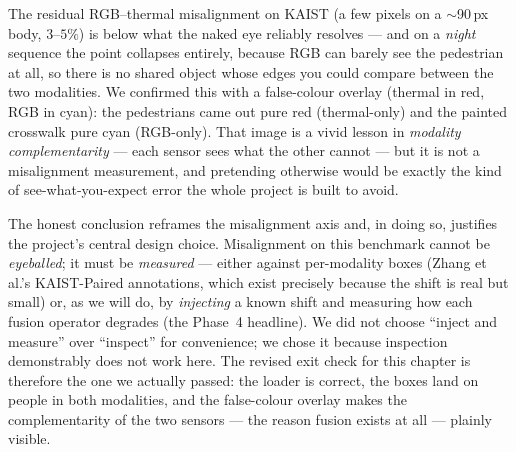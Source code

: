 \documentclass[../main.tex]{subfiles}
\begin{document}
\begin{lesson}
The residual RGB--thermal misalignment on KAIST (a few pixels on a $\sim$90\,px body,
$3$--$5\%$) is below what the naked eye reliably resolves --- and on a \emph{night} sequence
the point collapses entirely, because RGB can barely see the pedestrian at all, so there is no
shared object whose edges you could compare between the two modalities. We confirmed this with
a false-colour overlay (thermal in red, RGB in cyan): the pedestrians came out pure red
(thermal-only) and the painted crosswalk pure cyan (RGB-only). That image is a vivid lesson in
\emph{modality complementarity} --- each sensor sees what the other cannot --- but it is not a
misalignment measurement, and pretending otherwise would be exactly the kind of
see-what-you-expect error the whole project is built to avoid.
\end{lesson}

The honest conclusion reframes the misalignment axis and, in doing so, justifies the project's
central design choice. Misalignment on this benchmark cannot be \emph{eyeballed}; it must be
\emph{measured} --- either against per-modality boxes (Zhang et al.'s KAIST-Paired annotations,
which exist precisely because the shift is real but small) or, as we will do, by \emph{injecting}
a known shift and measuring how each fusion operator degrades (the Phase~4 headline). We did not
choose ``inject and measure'' over ``inspect'' for convenience; we chose it because inspection
demonstrably does not work here. The revised exit check for this chapter is therefore the one we
actually passed: the loader is correct, the boxes land on people in both modalities, and the
false-colour overlay makes the complementarity of the two sensors --- the reason fusion exists
at all --- plainly visible.
\end{document}
